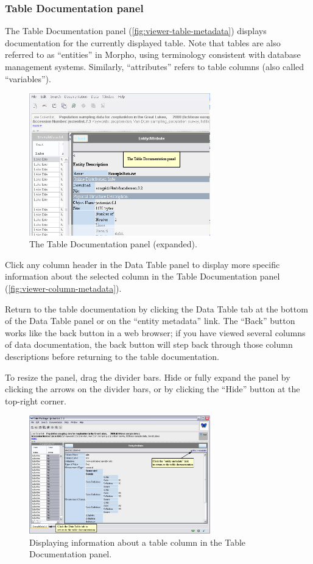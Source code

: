 \subsubsection{Table Documentation panel} \label{sec:panel-table-doc}

The Table Documentation panel (\autoref{fig:viewer-table-metadata}) displays
documentation for the currently displayed table. Note that tables are
also referred to as ``entities'' in Morpho, using terminology consistent
with database management systems. Similarly, ``attributes'' refers to
table columns (also called ``variables'').

\begin{figure}
  \centering
    \includegraphics[width=0.7\textwidth]{images/viewer-table-metadata.jpg}
  \caption{The Table Documentation panel (expanded).}
  \label{fig:viewer-table-metadata}
\end{figure}

Click any column header in the Data Table panel to display more specific
information about the selected column in the Table Documentation panel
(\autoref{fig:viewer-column-metadata}).

Return to the table documentation by clicking the Data Table tab at the
bottom of the Data Table panel or on the ``entity metadata'' link. The
``Back'' button works like the back button in a web browser; if you have
viewed several columns of data documentation, the back button will step
back through those column descriptions before returning to the table
documentation. 

To resize the panel, drag the divider bars. Hide or fully expand the
panel by clicking the arrows on the divider bars, or by clicking the
``Hide'' button at the top-right corner. 

\begin{figure}
  \centering
    \includegraphics[width=0.7\textwidth]{images/viewer-column-metadata.jpg}
  \caption{Displaying information about a table column in the Table
    Documentation panel.}
  \label{fig:viewer-column-metadata}
\end{figure}

